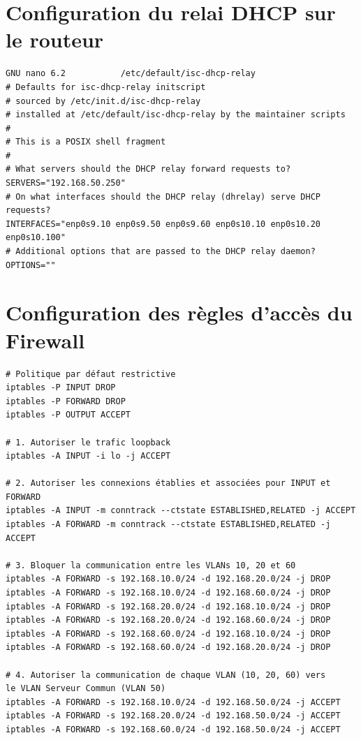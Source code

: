 \documentclass[a4paper,12pt,openany]{report}
\begin{document}
\begin{appendices}
        \chapter{Configuration du relai DHCP sur le routeur}
            \begin{verbatim}
GNU nano 6.2           /etc/default/isc-dhcp-relay                                      
# Defaults for isc-dhcp-relay initscript
# sourced by /etc/init.d/isc-dhcp-relay
# installed at /etc/default/isc-dhcp-relay by the maintainer scripts
#
# This is a POSIX shell fragment
#
# What servers should the DHCP relay forward requests to?
SERVERS="192.168.50.250"
# On what interfaces should the DHCP relay (dhrelay) serve DHCP requests?
INTERFACES="enp0s9.10 enp0s9.50 enp0s9.60 enp0s10.10 enp0s10.20 enp0s10.100"
# Additional options that are passed to the DHCP relay daemon?
OPTIONS=""
            \end{verbatim}

        \chapter{Configuration des règles d'accès du Firewall}
            \begin{verbatim}
# Politique par défaut restrictive
iptables -P INPUT DROP
iptables -P FORWARD DROP
iptables -P OUTPUT ACCEPT

# 1. Autoriser le trafic loopback
iptables -A INPUT -i lo -j ACCEPT

# 2. Autoriser les connexions établies et associées pour INPUT et FORWARD
iptables -A INPUT -m conntrack --ctstate ESTABLISHED,RELATED -j ACCEPT
iptables -A FORWARD -m conntrack --ctstate ESTABLISHED,RELATED -j ACCEPT

# 3. Bloquer la communication entre les VLANs 10, 20 et 60
iptables -A FORWARD -s 192.168.10.0/24 -d 192.168.20.0/24 -j DROP
iptables -A FORWARD -s 192.168.10.0/24 -d 192.168.60.0/24 -j DROP
iptables -A FORWARD -s 192.168.20.0/24 -d 192.168.10.0/24 -j DROP
iptables -A FORWARD -s 192.168.20.0/24 -d 192.168.60.0/24 -j DROP
iptables -A FORWARD -s 192.168.60.0/24 -d 192.168.10.0/24 -j DROP
iptables -A FORWARD -s 192.168.60.0/24 -d 192.168.20.0/24 -j DROP

# 4. Autoriser la communication de chaque VLAN (10, 20, 60) vers
le VLAN Serveur Commun (VLAN 50)
iptables -A FORWARD -s 192.168.10.0/24 -d 192.168.50.0/24 -j ACCEPT
iptables -A FORWARD -s 192.168.20.0/24 -d 192.168.50.0/24 -j ACCEPT
iptables -A FORWARD -s 192.168.60.0/24 -d 192.168.50.0/24 -j ACCEPT


\end{verbatim}
\end{appendices}
\end{document}
